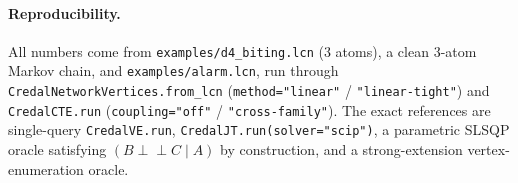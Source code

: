 \documentclass[11pt]{article}
\newcommand{\indep}{\perp\!\!\!\perp}
\begin{document}
\paragraph{Reproducibility.} All numbers come from \texttt{examples/d4\_biting.lcn}
(3 atoms), a clean $3$-atom Markov chain, and \texttt{examples/alarm.lcn}, run through
\texttt{CredalNetworkVertices.from\_lcn} (\texttt{method="linear"} / \texttt{"linear-tight"})
and \texttt{CredalCTE.run} (\texttt{coupling="off"} / \texttt{"cross-family"}). The exact
references are single-query \texttt{CredalVE.run}, \texttt{CredalJT.run(solver="scip")}, a
parametric SLSQP oracle satisfying $(B\indep C\mid A)$ by construction, and a strong-extension
vertex-enumeration oracle.
\end{document}
